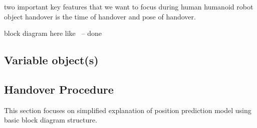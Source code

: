 two important key features that we want to focus during human humanoid robot object handover is the time of handover and pose of handover.

block diagram here like~\cite{li2015predicting} -- done


\subsection{Variable object(s)}


\subsection{Handover Procedure}\label{fig:Pred_blockDiag}
This section focuses on simplified explanation of position prediction model using basic block diagram structure.

